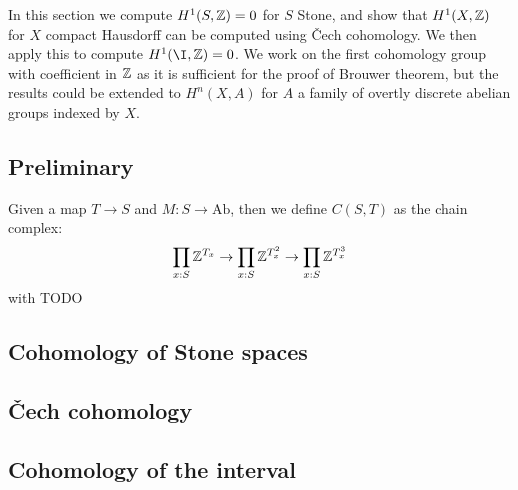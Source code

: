 In this section we compute $H^1(S,\mathbb{Z}) = 0$ for $S$ Stone, and show that $H^1(X,\mathbb{Z})$ for $X$ compact Hausdorff can be computed using \v{C}ech cohomology. We then apply this to compute $H^1(\I,\Z)=0$. We work on the first cohomology group with coefficient in $\mathbb{Z}$ as it is sufficient for the proof of Brouwer theorem, but the results could be extended to $H^n(X,A)$ for $A$ a family of overtly discrete abelian groups indexed by $X$.

\subsection{Preliminary}

\begin{definition}
Given a map $T\to S$ and $M:S\to \mathrm{Ab}$, then we define $C(S,T)$ as the chain complex:
\[\prod_{x:S}\mathbb{Z}^{T_x} \to \prod_{x:S}\mathbb{Z}^{T_x^2}\to \prod_{x:S}\mathbb{Z}^{T_x^3}\]
with TODO
\end{definition}

\subsection{Cohomology of Stone spaces}

\subsection{\v{C}ech cohomology}

\subsection{Cohomology of the interval}